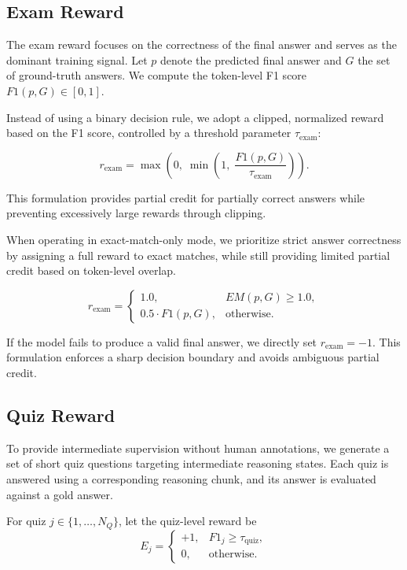 \documentclass[12pt]{report}
\begin{document}
\subsection{ Exam Reward}
The exam reward focuses on the correctness of the final answer and serves as the
dominant training signal. Let $p$ denote the predicted final answer and $G$ the
set of ground-truth answers. We compute the token-level F1 score
$F1(p, G) \in [0,1]$.

Instead of using a binary decision rule, we adopt a clipped, normalized reward
based on the F1 score, controlled by a threshold parameter $\tau_{\text{exam}}$:

\begin{equation}
r_{\text{exam}}
= \max\!\left(
0,\;
\min\!\left(
1,\;
\frac{F1(p, G)}{\tau_{\text{exam}}}
\right)
\right).
\end{equation}

This formulation provides partial credit for partially correct answers while preventing excessively large rewards through clipping.

When operating in exact-match-only mode, we prioritize strict answer correctness
by assigning a full reward to exact matches, while still providing limited
partial credit based on token-level overlap.

\begin{equation}
r_{\text{exam}} =
\begin{cases}
1.0, 
& EM(p, G) \ge 1.0, \\[6pt]
0.5 \cdot F1(p, G), 
& \text{otherwise}.
\end{cases}
\end{equation}


If the model fails to produce a valid final answer, we directly set
$r_{\text{exam}} = -1$. This formulation enforces a sharp decision boundary and
avoids ambiguous partial credit.

\subsection{Quiz Reward}
\label{sec:quiz-reward}
To provide intermediate supervision without human annotations, we generate a set of short quiz questions targeting intermediate reasoning states. Each quiz is answered using a corresponding reasoning chunk, and its answer is evaluated against a gold answer.

For quiz $j \in \{1, \ldots, N_Q\}$, let the quiz-level reward be
\begin{equation}
E_j =
\begin{cases}
+1, & F1_j \ge \tau_{\text{quiz}}, \\[6pt]
0, & \text{otherwise}.
\end{cases}
\end{equation}
\end{document}
